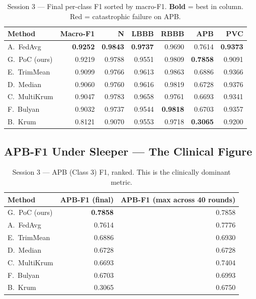 \documentclass[11pt,a4paper]{article}
\begin{document}
\begin{table}[H]
\centering
\caption{Session 3 --- Final per-class F1 sorted by macro-F1. \textbf{Bold} = best in column. \colorbox{softred}{Red} = catastrophic failure on APB.}
\label{tab:s3_final}
\begin{tabular}{@{}l r rrrrr@{}}
\toprule
\textbf{Method} & \textbf{Macro-F1} & \textbf{N} & \textbf{LBBB} & \textbf{RBBB} & \textbf{APB} & \textbf{PVC} \\
\midrule
A.\ FedAvg    & \textbf{0.9252} & \textbf{0.9843} & \textbf{0.9737} & 0.9690 & 0.7614 & \textbf{0.9373} \\
G.\ PoC (ours) & 0.9219 & 0.9788 & 0.9551 & 0.9809 & \textbf{0.7858} & 0.9091 \\
E.\ TrimMean  & 0.9099 & 0.9766 & 0.9613 & 0.9863 & 0.6886 & 0.9366 \\
D.\ Median    & 0.9060 & 0.9760 & 0.9616 & 0.9819 & 0.6728 & 0.9376 \\
C.\ MultiKrum & 0.9047 & 0.9783 & 0.9658 & 0.9761 & 0.6693 & 0.9341 \\
F.\ Bulyan    & 0.9032 & 0.9737 & 0.9544 & \textbf{0.9818} & 0.6703 & 0.9357 \\
\rowcolor{softred}
B.\ Krum      & 0.8121 & 0.9070 & 0.9553 & 0.9718 & \textbf{0.3065} & 0.9200 \\
\bottomrule
\end{tabular}
\end{table}

\subsection{APB-F1 Under Sleeper --- The Clinical Figure}

\begin{table}[H]
\centering
\caption{Session 3 --- APB (Class 3) F1, ranked. This is the clinically dominant metric.}
\label{tab:s3_apb}
\begin{tabular}{@{}l r r@{}}
\toprule
\textbf{Method} & \textbf{APB-F1 (final)} & \textbf{APB-F1 (max across 40 rounds)} \\
\midrule
G.\ PoC (ours) & \textbf{0.7858} & 0.7858 \\
A.\ FedAvg    & 0.7614 & 0.7776 \\
E.\ TrimMean  & 0.6886 & 0.6930 \\
D.\ Median    & 0.6728 & 0.6728 \\
C.\ MultiKrum & 0.6693 & 0.7404 \\
F.\ Bulyan    & 0.6703 & 0.6993 \\
\rowcolor{softred}
B.\ Krum      & 0.3065 & 0.6750 \\
\bottomrule
\end{tabular}
\end{table}
\end{document}
